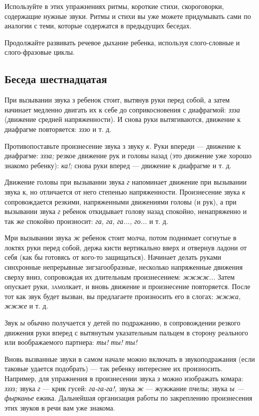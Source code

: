 \documentclass{book}
\renewcommand{\emph}[1]{\textit{#1}}
\begin{document}
Используйте в этих упражнениях ритмы, короткие стихи, скороговорки,
содержащие нужные звуки. Ритмы и стихи вы уже можете придумывать сами по
аналогии с теми, которые содержатся в предыдущих беседах.

Продолжайте развивать речевое дыхание ребенка, используя слого-словные и
слого-фразовые циклы.

\subsection*{Беседа шестнадцатая}

При вызывании звука з ребенок стоит, вытянув руки перед собой, а затем
начинает медленно двигать их к себе до соприкосновения с диафрагмой:
\emph{ззза} (движение средней напряженности). И снова руки вытягиваются,
движение к диафрагме повторяется: \emph{зззо} и т. д.

Противопоставьте произнесение звука з звуку \emph{к.} Руки впереди ---
движение к диафрагме: \emph{ззза;} резкое движение рук и головы назад
(это движение уже хорошо знакомо ребенку): \emph{ка!;} снова руки вперед
--- движение к диафрагме и т. д.

Движение головы при вызывании звука \emph{г} напоминает движение при
вызывании звука к, но отличается от него степенью напряженности.
Произнесение звука \emph{к} сопровождается резкими, напряженными
движениями головы (и рук), а при вызывании звука \emph{г} ребенок
откидывает голову назад спокойно, ненапряженно и так же спокойно
произносит: \emph{га, га, га..., го...} и т. д.

Мри вызывании звука \emph{ж} ребенок стоит молча, потом поднимает
согнутые в локтях руки перед собой, держа кисти вертикально вверх и
отвернув ладони от себя (как бы готовясь от кого-то защищаться).
Начинает делать руками синхронные непрерывные зигзагообразные, несколько
напряженные движения сверху вниз, сопровождая их длительным
произнесением: \emph{жжжж...} Затем опускает руки, \textsc{зам}олкает, и
вновь движение и произнесение повторяется. После тот как звук будет
вызван, вы предлагаете произносить его в слогах: \emph{жжжа, жжже} и т.
д.

Звук \emph{ы} обычно получается у детей по подражанию, в сопровождении
резкого движения руки вперед с вытянутым указательным пальцем в сторону
реального или воображаемого партнера: \emph{ты! ты! ты!}

Вновь вызванные звуки в самом начале можно включать в звукоподражания
(если таковые удается подобрать) --- так ребенку интереснее их
произносить. Например, для упражнения в произнесении звука \emph{з}
можно изображать комара: \emph{зззз;} звука \emph{г} --- крик гусей:
\emph{га-га-га!,} звука \emph{ж} --- жужжание пчелы; звука \emph{ы ---
фырканье} ежика. Дальнейшая организация работы по закреплению
произнесения этих звуков в речи вам уже знакома.
\end{document}
